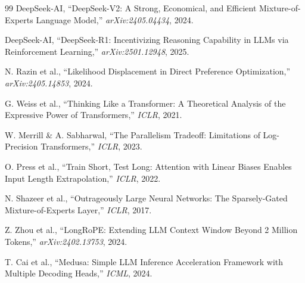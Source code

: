 \documentclass[11pt,a4paper]{book}
\theoremstyle{definition}
\begin{document}
\begin{thebibliography}{99}
	 DeepSeek-AI, ``DeepSeek-V2: A Strong, Economical, and Efficient Mixture-of-Experts Language Model,'' \emph{arXiv:2405.04434}, 2024.

	 DeepSeek-AI, ``DeepSeek-R1: Incentivizing Reasoning Capability in LLMs via Reinforcement Learning,'' \emph{arXiv:2501.12948}, 2025.

	 N. Razin et al., ``Likelihood Displacement in Direct Preference Optimization,'' \emph{arXiv:2405.14853}, 2024.

	 G. Weiss et al., ``Thinking Like a Transformer: A Theoretical Analysis of the Expressive Power of Transformers,'' \emph{ICLR}, 2021.

	 W. Merrill \& A. Sabharwal, ``The Parallelism Tradeoff: Limitations of Log-Precision Transformers,'' \emph{ICLR}, 2023.

	 O. Press et al., ``Train Short, Test Long: Attention with Linear Biases Enables Input Length Extrapolation,'' \emph{ICLR}, 2022.

	 N. Shazeer et al., ``Outrageously Large Neural Networks: The Sparsely-Gated Mixture-of-Experts Layer,'' \emph{ICLR}, 2017.

	 Z. Zhou et al., ``LongRoPE: Extending LLM Context Window Beyond 2 Million Tokens,'' \emph{arXiv:2402.13753}, 2024.

	 T. Cai et al., ``Medusa: Simple LLM Inference Acceleration Framework with Multiple Decoding Heads,'' \emph{ICML}, 2024.

\end{thebibliography}
\end{document}
